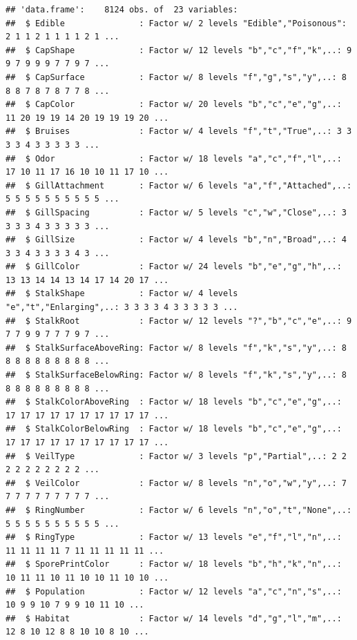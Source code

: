 \documentclass[10pt  ,usenames, dvipsnames]{article}\usepackage[]{graphicx}\usepackage[]{color}
\makeatletter
\newenvironment{kframe}{%
 \def\at@end@of@kframe{}%
 \ifinner\ifhmode%
  \def\at@end@of@kframe{\end{minipage}}%
  \begin{minipage}{\columnwidth}%
 \fi\fi%
 \def\FrameCommand##1{\hskip\@totalleftmargin \hskip-\fboxsep
 \colorbox{shadecolor}{##1}\hskip-\fboxsep
     \hskip-\linewidth \hskip-\@totalleftmargin \hskip\columnwidth}%
 \MakeFramed {\advance\hsize-\width
   \@totalleftmargin\z@ \linewidth\hsize
   \@setminipage}}%
 {\par\unskip\endMakeFramed%
 \at@end@of@kframe}
\newenvironment{knitrout}{}{} %
\makeatother
\begin{document}
\begin{knitrout}
\color{fgcolor}\begin{kframe}
\begin{verbatim}
## 'data.frame':	8124 obs. of  23 variables:
##  $ Edible               : Factor w/ 2 levels "Edible","Poisonous": 2 1 1 2 1 1 1 1 2 1 ...
##  $ CapShape             : Factor w/ 12 levels "b","c","f","k",..: 9 9 7 9 9 9 7 7 9 7 ...
##  $ CapSurface           : Factor w/ 8 levels "f","g","s","y",..: 8 8 8 7 8 7 8 7 7 8 ...
##  $ CapColor             : Factor w/ 20 levels "b","c","e","g",..: 11 20 19 19 14 20 19 19 19 20 ...
##  $ Bruises              : Factor w/ 4 levels "f","t","True",..: 3 3 3 3 4 3 3 3 3 3 ...
##  $ Odor                 : Factor w/ 18 levels "a","c","f","l",..: 17 10 11 17 16 10 10 11 17 10 ...
##  $ GillAttachment       : Factor w/ 6 levels "a","f","Attached",..: 5 5 5 5 5 5 5 5 5 5 ...
##  $ GillSpacing          : Factor w/ 5 levels "c","w","Close",..: 3 3 3 3 4 3 3 3 3 3 ...
##  $ GillSize             : Factor w/ 4 levels "b","n","Broad",..: 4 3 3 4 3 3 3 3 4 3 ...
##  $ GillColor            : Factor w/ 24 levels "b","e","g","h",..: 13 13 14 14 13 14 17 14 20 17 ...
##  $ StalkShape           : Factor w/ 4 levels "e","t","Enlarging",..: 3 3 3 3 4 3 3 3 3 3 ...
##  $ StalkRoot            : Factor w/ 12 levels "?","b","c","e",..: 9 7 7 9 9 7 7 7 9 7 ...
##  $ StalkSurfaceAboveRing: Factor w/ 8 levels "f","k","s","y",..: 8 8 8 8 8 8 8 8 8 8 ...
##  $ StalkSurfaceBelowRing: Factor w/ 8 levels "f","k","s","y",..: 8 8 8 8 8 8 8 8 8 8 ...
##  $ StalkColorAboveRing  : Factor w/ 18 levels "b","c","e","g",..: 17 17 17 17 17 17 17 17 17 17 ...
##  $ StalkColorBelowRing  : Factor w/ 18 levels "b","c","e","g",..: 17 17 17 17 17 17 17 17 17 17 ...
##  $ VeilType             : Factor w/ 3 levels "p","Partial",..: 2 2 2 2 2 2 2 2 2 2 ...
##  $ VeilColor            : Factor w/ 8 levels "n","o","w","y",..: 7 7 7 7 7 7 7 7 7 7 ...
##  $ RingNumber           : Factor w/ 6 levels "n","o","t","None",..: 5 5 5 5 5 5 5 5 5 5 ...
##  $ RingType             : Factor w/ 13 levels "e","f","l","n",..: 11 11 11 11 7 11 11 11 11 11 ...
##  $ SporePrintColor      : Factor w/ 18 levels "b","h","k","n",..: 10 11 11 10 11 10 10 11 10 10 ...
##  $ Population           : Factor w/ 12 levels "a","c","n","s",..: 10 9 9 10 7 9 9 10 11 10 ...
##  $ Habitat              : Factor w/ 14 levels "d","g","l","m",..: 12 8 10 12 8 8 10 10 8 10 ...
\end{verbatim}
\end{kframe}
\end{knitrout}
\end{document}
